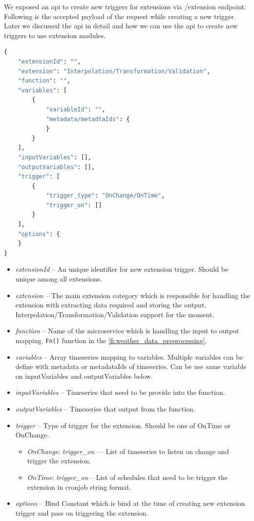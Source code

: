 We exposed an \acrshort{api} to create new triggers for extensions via /extension endpoint. Following is the accepted payload of the request while creating a new trigger. Later we discussed the \acrshort{api} in detail and how we can use the \acrshort{api} to create new triggers to use extension modules.

\begin{lstlisting}[language=Python]
{
    "extensionId": "",
    "extension": "Interpolation/Transformation/Validation",
    "function": "",
    "variables": [
        {
            "variableId": "",
            "metadata/metadtaIds": {
            }
        }
    ],
    "inputVariables": [],
    "outputVariables": [],
    "trigger": [
        {
            "trigger_type": "OnChange/OnTime",
            "trigger_on": []
        }
    ],
    "options": {
    }
}
\end{lstlisting}
\begin{itemize}
    \item \emph{extensionId} -- An unique identifier for new extension trigger. Should be unique among all extensions.
    \item \emph{extension} -- The main extension category which is responsible for handling the extension with extracting data required and storing the output. Interpolation/Transformation/Validation support for the moment.
    \item \emph{function} -- Name of the microservice which is handling the input to output mapping. \texttt{Fn()} function in the \cref{fi:weather_data_preprocessing}.
    \item \emph{variables} -- Array timeseries mapping to variables. Multiple variables can be define with metadata or metadataIds of timeseries. Can be use same variable on inputVariables and outputVariables below.
    \item \emph{inputVariables} -- Timeseries that need to be provide into the function.
    \item \emph{outputVariables} -- Timeseries that output from the function.
    \item \emph{trigger} -- Type of trigger for the extension. Should be one of OnTime or OnChange.
        \begin{itemize}
            \item \emph{OnChange}: \textit{trigger\_on} --- List of timeseries to listen on change and trigger the extension.
            \item \emph{OnTime}: \textit{trigger\_on} -- List of schedules that need to be trigger the extension in cronjob string format.
        \end{itemize}
    \item \emph{options} -- Bind Constant which is bind at the time of creating new extension trigger and pass on triggering the extension.
\end{itemize}

